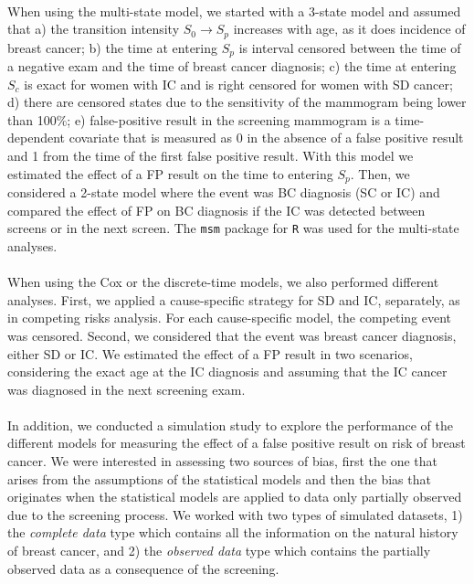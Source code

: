 \paragraph{} When using the multi-state model, we started with a 3-state model and assumed that a) the transition intensity $S_0 \rightarrow S_p$ increases with age, as it does incidence of breast cancer; b) the time at entering $S_p$ is interval censored between the time of a negative exam and the time of breast cancer diagnosis; c) the time at entering $S_c$ is exact for women with IC and is right censored for women with SD cancer; d) there are censored states due to the sensitivity of the mammogram being lower than 100\%; e) false-positive result in the screening mammogram is a time-dependent covariate that is measured as 0 in the absence of a false positive result and 1 from the time of the first false positive result. With this model we estimated the effect of a FP result on the time to entering $S_p$. Then, we considered a 2-state model where the event was BC diagnosis (SC or IC) and compared the effect of FP on BC diagnosis if the IC was detected between screens or in the next screen. The {\tt msm} package for {\tt R} \cite{Jackson2011} was used for the multi-state analyses.

\paragraph{} When using the Cox or the discrete-time models, we also performed different analyses. First, we applied a cause-specific strategy for SD and IC, separately, as in competing risks analysis. For each cause-specific model, the competing event was censored. Second, we considered that the event was breast cancer diagnosis, either SD or IC. We estimated the effect of a FP result in two scenarios, considering the exact age at the IC diagnosis and assuming that the IC cancer was diagnosed in the next screening exam.

\paragraph{} In addition, we conducted a simulation study to explore the performance of the different models for measuring the effect of a false positive result on risk of breast cancer. We were interested in assessing two sources of bias, first the one that arises from the assumptions of the statistical models and then the bias that originates when the statistical models are applied to data only partially observed due to the screening process. We worked with two types of simulated datasets, 1) the \textit{complete data} type which contains all the information on the natural history of breast cancer, and 2) the \textit{observed data} type which contains the partially observed data as a consequence of the screening.

